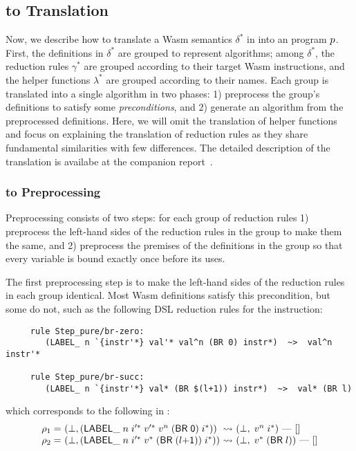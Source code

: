 \subsection{\dl to \al Translation}\label{sec:dl2al}
Now, we describe how to translate a Wasm semantics $\delta^*$ in \dl into an \al program $p$.
First, the definitions in $\delta^*$ are grouped to represent algorithms; among $\delta^*$,
the reduction rules $\gamma^*$ are grouped according to their target Wasm instructions, and
the helper functions $\lambda^*$ are grouped according to their names.
Each group is translated into a single algorithm in two phases:
1) preprocess the group's definitions to satisfy some \textit{preconditions}, and
2) generate an \al algorithm from the preprocessed \dl definitions.
Here, we will omit the translation of helper functions and
focus on explaining the translation of reduction rules as they share fundamental similarities
with few differences.
The detailed description of the translation is availabe at the companion report~\cite{il-tr}.

\subsubsection{\dl to \dl Preprocessing}
Preprocessing consists of two steps: for each group of reduction rules
1) preprocess the left-hand sides of the reduction rules
in the group to make them the same, and
2) preprocess the premises of the definitions in the group
so that every variable is bound exactly once before its uses.

\medskip
The first preprocessing step is to make the left-hand sides of
the reduction rules in each group identical.
Most Wasm definitions satisfy this precondition, but some do not, such as the following
DSL reduction rules for the  instruction:

{
\begin{verbatim}
     rule Step_pure/br-zero:
        (LABEL_ n `{instr'*} val'* val^n (BR 0) instr*)  ~>  val^n instr'*

     rule Step_pure/br-succ:
        (LABEL_ n `{instr'*} val* (BR $(l+1)) instr*)  ~>  val* (BR l)
\end{verbatim}
}

\noindent
which corresponds to the following in \dl:
\[
\begin{array}{l@{~}l@{~}c@{~}l}
\rho_1 = &(\bot, (\ssf{LABEL\_} \; n \; i'^*\; v'^*\; v^n\; (\ssf{BR\; 0})\; i^*)) &\leadsto&
 (\bot,\; v^n\; i^*)\ \mbox{---}\ []\\
\rho_2 = &(\bot, (\ssf{LABEL\_} \; n \; i'^*\; v^*\; (\ssf{BR\; (}l\ssf{+1)})\; i^*)) &\leadsto&
 (\bot,\; v^*\; (\ssf{BR}\; l))\ \mbox{---}\ []
\end{array}
\]

